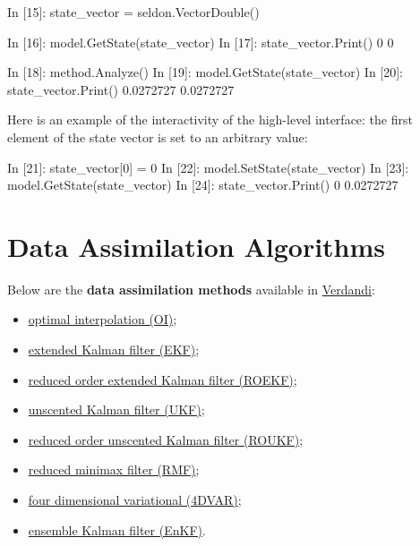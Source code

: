 \documentclass{tufte-book}
\begin{document}
 \begin{frame_python}
In [15]: state_vector = seldon.VectorDouble()

In [16]: model.GetState(state_vector)
In [17]: state_vector.Print()
0   0

In [18]: method.Analyze()
In [19]: model.GetState(state_vector)
In [20]: state_vector.Print()
0.0272727   0.0272727
\end{frame_python}


\-Here is an example of the interactivity of the high-\/level interface\-: the first element of the state vector is set to an arbitrary value\-:  \begin{frame_python}
In [21]: state_vector[0] = 0
In [22]: model.SetState(state_vector)
In [23]: model.GetState(state_vector)
In [24]: state_vector.Print()
0  0.0272727
\end{frame_python}

\hypertarget{data_assimilation_algorithms}{}\chapter{Data Assimilation Algorithms}\label{data_assimilation_algorithms}

\-Below are the {\bfseries data assimilation methods} available in \hyperlink{namespace_verdandi}{\-Verdandi}\-:


\begin{itemize}
\item \hyperlink{optimal_interpolation}{optimal interpolation (\-O\-I)};
\item \hyperlink{extended_kalman_filter}{extended \-Kalman filter (\-E\-K\-F)};
\item \hyperlink{reduced_order_extended_kalman_filter}{reduced order extended \-Kalman filter (\-R\-O\-E\-K\-F)};
\item \hyperlink{unscented_kalman_filter}{unscented \-Kalman filter (\-U\-K\-F)};
\item \hyperlink{reduced_order_unscented_kalman_filter}{reduced order unscented \-Kalman filter (\-R\-O\-U\-K\-F)};
\item \hyperlink{reduced_minimax_filter}{reduced minimax filter (\-R\-M\-F)};
\item \hyperlink{four_dimensional_variational}{four dimensional variational (4\-D\-V\-A\-R)};
\item \hyperlink{ensemble_kalman_filter}{ensemble \-Kalman filter (\-En\-K\-F)}.
\end{itemize}
\end{document}
